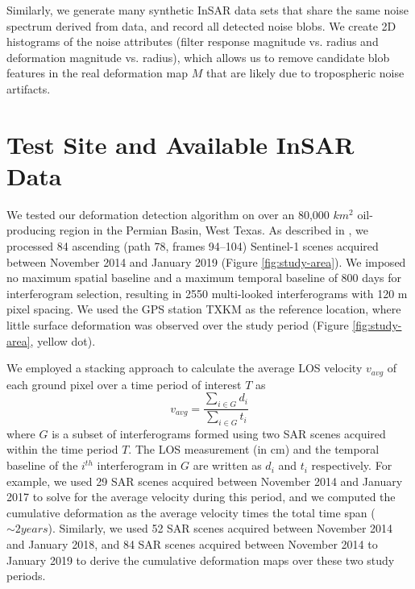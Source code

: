 \documentclass{utexasthesis}
\begin{document}
Similarly, we generate many synthetic InSAR data sets that share the same noise spectrum derived from data, and record all detected noise blobs. We create 2D histograms of the noise attributes (filter response magnitude vs. radius and deformation magnitude vs. radius), which allows us to remove candidate blob features in the real deformation map $M$ that are likely due to tropospheric noise artifacts.

\section{Test Site and Available InSAR Data}
\label{sec:site}

We tested our deformation detection algorithm on over an 80,000 $km^2$ oil-producing region in the Permian Basin, West Texas.  As described in \citep{Staniewicz2020InsarRevealsComplex}, we processed 84 ascending (path 78, frames 94–104) Sentinel-1 scenes acquired between November 2014 and January 2019 (Figure \ref{fig:study-area}). We imposed no maximum spatial baseline and a maximum temporal baseline of 800 days for interferogram selection, resulting in 2550 multi-looked interferograms with 120 m pixel spacing.  We used the GPS station TXKM as the reference location, where little surface deformation was observed over the study period (Figure \ref{fig:study-area}, yellow dot).

We employed a stacking approach \citep{Sandwell1998PhaseGradientApproach, Staniewicz2020InsarRevealsComplex} to calculate the average LOS velocity $v_{avg}$ of each ground pixel over a time period of interest $ T $ as
\begin{equation}
v_{avg} = \frac{\sum_{i \in G} d_i}{\sum_{i \in G} t_i}
\label{eq:stacking}
\end{equation}
where $G$ is a subset of interferograms formed using two SAR scenes acquired within the time period $T$. The LOS measurement (in cm) and the temporal baseline of the $i^{th}$ interferogram in $G$ are written as $d_i$ and $ t_i $ respectively.
For example, we used 29 SAR scenes acquired between November 2014 and January 2017 to solve for the average velocity during this period, and we computed the cumulative deformation as the average velocity times the total time span ($\sim 2 years$). Similarly, we used 52 SAR scenes acquired between November 2014 and January 2018, and 84 SAR scenes acquired between November 2014 to January 2019 to derive the cumulative deformation maps over these two study periods.
\end{document}
